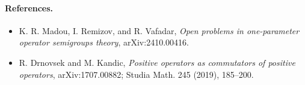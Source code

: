 \documentclass[11pt]{article}
\begin{document}
\paragraph{References.}
\begin{itemize}
\item K. R. Madou, I. Remizov, and R. Vafadar, \emph{Open problems in one-parameter operator semigroups theory}, arXiv:2410.00416.
\item R. Drnovsek and M. Kandic, \emph{Positive operators as commutators of positive operators}, arXiv:1707.00882; Studia Math. 245 (2019), 185--200.
\end{itemize}
\end{document}
